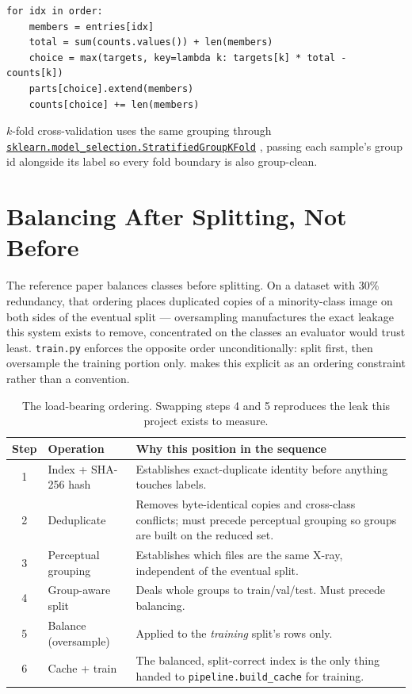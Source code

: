 \documentclass[11pt,a4paper,oneside]{report}
\newcommand{\code}[1]{\texttt{\small #1}}
\begin{document}
\begin{lstlisting}[caption={Greedy quota assignment keeps every split near its
target proportion while never splitting a group
(\texttt{lxnet/data.py:group\_aware\_split}).}, label=lst:groupsplit]
for idx in order:
    members = entries[idx]
    total = sum(counts.values()) + len(members)
    choice = max(targets, key=lambda k: targets[k] * total - counts[k])
    parts[choice].extend(members)
    counts[choice] += len(members)
\end{lstlisting}

$k$-fold cross-validation uses the same grouping through
\href{https://scikit-learn.org/stable/modules/generated/sklearn.model_selection.StratifiedGroupKFold.html}{\code{sklearn.model\_selection.StratifiedGroupKFold}}
\cite{pedregosa2011}, passing each sample's group id alongside its label so
every fold boundary is also group-clean.

\section{Balancing After Splitting, Not Before}
\label{sec:balance-order}

The reference paper balances classes before splitting. On a dataset with 30\%
redundancy, that ordering places duplicated copies of a minority-class image
on both sides of the eventual split --- oversampling manufactures the exact
leakage this system exists to remove, concentrated on the classes an
evaluator would trust least. \code{train.py} enforces the opposite order
unconditionally: split first, then oversample the training portion only.
 makes this explicit as an ordering constraint
rather than a convention.

\begin{table}[h]
\centering
\small
\begin{tabular}{@{}clp{7.2cm}@{}}
\toprule
\textbf{Step} & \textbf{Operation} & \textbf{Why this position in the sequence} \\
\midrule
1 & Index + SHA-256 hash & Establishes exact-duplicate identity before anything
  touches labels. \\
2 & Deduplicate & Removes byte-identical copies and cross-class conflicts;
  must precede perceptual grouping so groups are built on the reduced set. \\
3 & Perceptual grouping & Establishes which files are the same X-ray,
  independent of the eventual split. \\
4 & Group-aware split & Deals whole groups to train/val/test. Must precede
  balancing. \\
5 & Balance (oversample) & Applied to the \emph{training} split's rows only. \\
6 & Cache + train & The balanced, split-correct index is the only thing
  handed to \code{pipeline.build\_cache} for training. \\
\bottomrule
\end{tabular}
\caption{The load-bearing ordering. Swapping steps 4 and 5 reproduces the
leak this project exists to measure.}
\label{fig:pipeline-order}
\end{table}
\end{document}
